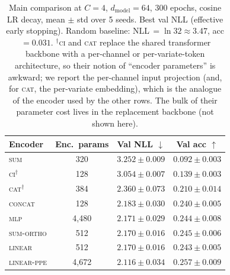 \begin{table}[t]
\centering
\caption{Main comparison at $C{=}4$, $d_{\text{model}}{=}64$, 300 epochs,
cosine LR decay, mean $\pm$ std over 5 seeds. Best val NLL (effective
early stopping). Random baseline: NLL$\,{=}\ln 32 \approx 3.47$,
acc$\,{=}0.031$.
$^\dagger$\textsc{ci} and \textsc{cat} replace the shared transformer
backbone with a per-channel or per-variate-token architecture, so
their notion of ``encoder parameters'' is awkward; we report the
per-channel input projection (and, for \textsc{cat}, the per-variate
embedding), which is the analogue of the encoder used by the other
rows. The bulk of their parameter cost lives in the replacement
backbone (not shown here).}
\label{tab:main}
\begin{tabular}{lccc}
\toprule
Encoder & Enc.\ params & Val NLL $\downarrow$ & Val acc $\uparrow$ \\
\midrule
\textsc{sum}            & 320      & $3.252 \pm 0.009$ & $0.092 \pm 0.003$ \\
\textsc{ci}$^\dagger$   & 128      & $3.054 \pm 0.007$ & $0.139 \pm 0.003$ \\
\textsc{cat}$^\dagger$  & 384      & $2.360 \pm 0.073$ & $0.210 \pm 0.014$ \\
\midrule
\textsc{concat}         & 128      & $2.183 \pm 0.030$ & $0.240 \pm 0.005$ \\
\textsc{mlp}            & 4{,}480  & $2.171 \pm 0.029$ & $0.244 \pm 0.008$ \\
\textsc{sum-ortho}      & 512      & $2.170 \pm 0.016$ & $0.245 \pm 0.006$ \\
\textsc{linear}         & 512      & $2.170 \pm 0.016$ & $0.243 \pm 0.005$ \\
\textsc{linear-ppe}     & 4{,}672  & $2.116 \pm 0.034$ & $0.257 \pm 0.009$ \\
\bottomrule
\end{tabular}
\end{table}

